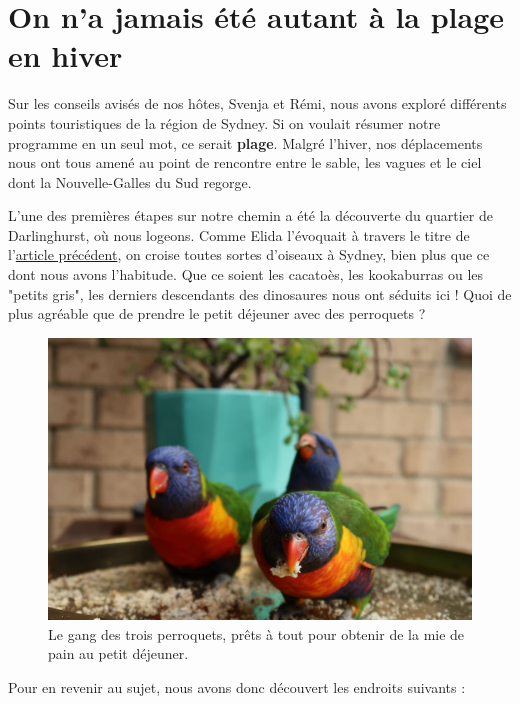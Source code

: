 \hypertarget{on-na-jamais-uxe9tuxe9-autant-uxe0-la-plage-en-hiver}{%
\section{On n'a jamais été autant à la plage en
hiver}\label{on-na-jamais-uxe9tuxe9-autant-uxe0-la-plage-en-hiver}}

Sur les conseils avisés de nos hôtes, Svenja et Rémi, nous avons exploré
différents points touristiques de la région de Sydney. Si on voulait
résumer notre programme en un seul mot, ce serait \textbf{plage}. Malgré
l'hiver, nos déplacements nous ont tous amené au point de rencontre
entre le sable, les vagues et le ciel dont la Nouvelle-Galles du Sud
regorge.

L'une des premières étapes sur notre chemin a été la découverte du
quartier de Darlinghurst, où nous logeons. Comme Elida l'évoquait à
travers le titre de l'\href{/arrivee-australie.html}{article précédent},
on croise toutes sortes d'oiseaux à Sydney, bien plus que ce dont nous
avons l'habitude. Que ce soient les cacatoès, les kookaburras ou les
"petits gris", les derniers descendants des dinosaures nous ont séduits
ici ! Quoi de plus agréable que de prendre le petit déjeuner avec des
perroquets ?

\begin{figure}
\centering
\includegraphics{images/20180726_perroquets.JPG}
\caption{Le gang des trois perroquets, prêts à tout pour obtenir de la
mie de pain au petit déjeuner.}
\end{figure}

Pour en revenir au sujet, nous avons donc découvert les endroits
suivants :

